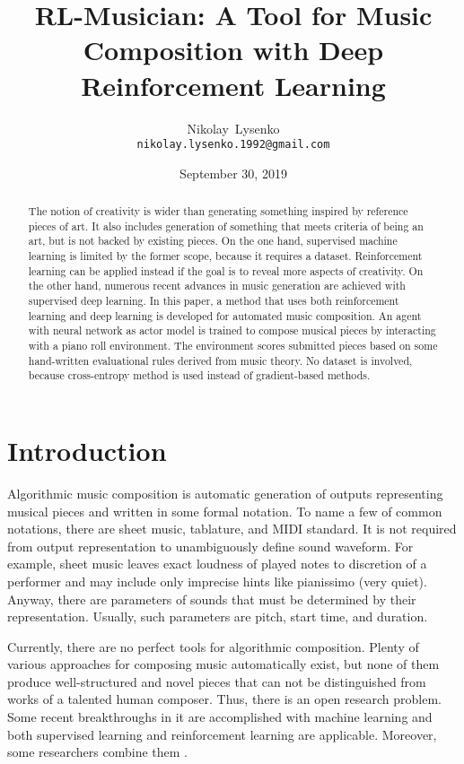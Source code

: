 \documentclass{article}
\title{RL-Musician: A Tool for Music Composition with Deep Reinforcement Learning}
\date{September 30, 2019}
\author{
  Nikolay~Lysenko\\
  \texttt{nikolay.lysenko.1992@gmail.com} \\
}
\begin{document}
\maketitle

\begin{abstract}
The notion of creativity is wider than generating something inspired by reference pieces of art. It also includes generation of something that meets criteria of being an art, but is not backed by existing pieces. On the one hand, supervised machine learning is limited by the former scope, because it requires a dataset. Reinforcement learning can be applied instead if the goal is to reveal more aspects of creativity. On the other hand, numerous recent advances in music generation are achieved with supervised deep learning. In this paper, a method that uses both reinforcement learning and deep learning is developed for automated music composition. An agent with neural network as actor model is trained to compose musical pieces by interacting with a piano roll environment. The environment scores submitted pieces based on some hand-written evaluational rules derived from music theory. No dataset is involved, because cross-entropy method is used instead of gradient-based methods.
\end{abstract}



\section{Introduction}
\label{sec:introduction}

Algorithmic music composition is automatic generation of outputs representing musical pieces and written in some formal notation. To name a few of common notations, there are sheet music, tablature, and MIDI standard. It is not required from output representation to unambiguously define sound waveform. For example, sheet music leaves exact loudness of played notes to discretion of a performer and may include only imprecise hints like pianissimo (very quiet). Anyway, there are parameters of sounds that must be determined by their representation. Usually, such parameters are pitch, start time, and duration.


Currently, there are no perfect tools for algorithmic composition. Plenty of various approaches for composing music automatically exist, but none of them produce well-structured and novel pieces that can not be distinguished from works of a talented human composer. Thus, there is an open research problem. Some recent breakthroughs in it are accomplished with machine learning and both supervised learning \cite{johnson2017generating} and reinforcement learning \cite{smith2012reinforcement} are applicable. Moreover, some researchers combine them \cite{jaques2016generating}.
\end{document}
